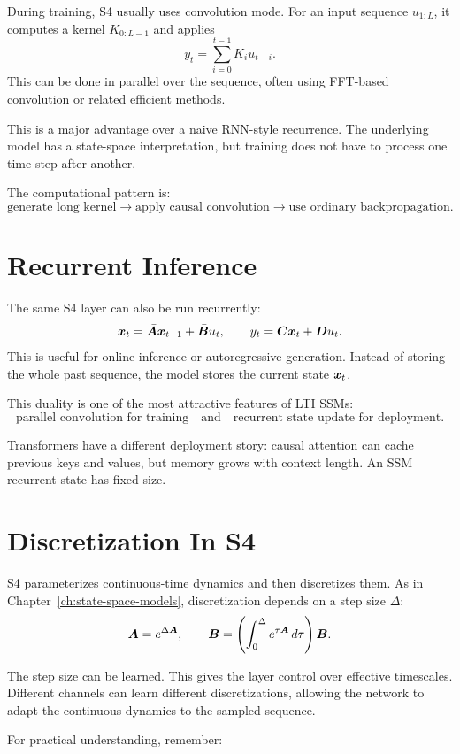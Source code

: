 During training, S4 usually uses convolution mode. For an input sequence $u_{1:L}$, it
computes a kernel $K_{0:L-1}$ and applies
\[
  y_t = \sum_{i=0}^{t-1} K_i u_{t-i}.
\]
This can be done in parallel over the sequence, often using FFT-based convolution or
related efficient methods.

This is a major advantage over a naive RNN-style recurrence. The underlying model has a
state-space interpretation, but training does not have to process one time step after
another.

The computational pattern is:
\[
  \text{generate long kernel}
  \rightarrow
  \text{apply causal convolution}
  \rightarrow
  \text{use ordinary backpropagation}.
\]

\section{Recurrent Inference}

The same S4 layer can also be run recurrently:
\[
  \bm{x}_t = \bar{\bm{A}}\bm{x}_{t-1}+\bar{\bm{B}}u_t,
  \qquad
  y_t=\bm{C}\bm{x}_t+\bm{D} u_t.
\]
This is useful for online inference or autoregressive generation. Instead of storing the
whole past sequence, the model stores the current state $\bm{x}_t$.

This duality is one of the most attractive features of LTI SSMs:
\[
  \text{parallel convolution for training}
  \quad \text{and} \quad
  \text{recurrent state update for deployment}.
\]

Transformers have a different deployment story: causal attention can cache previous keys
and values, but memory grows with context length. An SSM recurrent state has fixed size.

\section{Discretization In S4}

S4 parameterizes continuous-time dynamics and then discretizes them. As in
Chapter~\ref{ch:state-space-models}, discretization depends on a step size $\Delta$:
\[
  \bar{\bm{A}} = e^{\Delta\bm{A}},
  \qquad
  \bar{\bm{B}}
  =
  \left(\int_0^\Delta e^{\tau\bm{A}}\,d\tau\right)\bm{B}.
\]

The step size can be learned. This gives the layer control over effective timescales.
Different channels can learn different discretizations, allowing the network to adapt the
continuous dynamics to the sampled sequence.

For practical understanding, remember:


